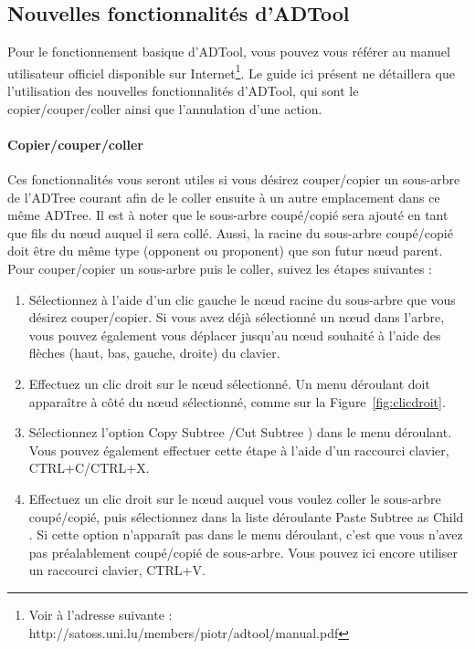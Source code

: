 \subsection{Nouvelles fonctionnalités d'ADTool}
\label{ssec:manuelADTool}

Pour le fonctionnement basique d'ADTool, vous pouvez vous référer au manuel utilisateur officiel disponible sur Internet\footnote{Voir à l'adresse suivante : http://satoss.uni.lu/members/piotr/adtool/manual.pdf}. Le guide ici présent ne détaillera que l'utilisation des nouvelles fonctionnalités d'ADTool, qui sont le copier/couper/coller ainsi que l'annulation d'une action.

\paragraph{Copier/couper/coller} Ces fonctionnalités vous seront utiles si vous désirez couper/copier un sous-arbre de l'ADTree courant afin de le coller ensuite à un autre emplacement dans ce même ADTree. Il est à noter que le sous-arbre coupé/copié sera ajouté en tant que fils du n\oe{}ud auquel il sera collé. Aussi, la racine du sous-arbre coupé/copié doit être du même type (opponent ou proponent) que son futur n\oe{}ud parent. Pour couper/copier un sous-arbre puis le coller, suivez les étapes suivantes : 
\begin{enumerate}
    \item Sélectionnez à l'aide d'un clic gauche le n\oe{}ud racine du sous-arbre que vous désirez couper/copier. Si vous avez déjà sélectionné un n\oe{}ud dans l'arbre, vous pouvez également vous déplacer jusqu'au n\oe{}ud souhaité à l'aide des flèches (haut, bas, gauche, droite) du clavier.
	\item Effectuez un clic droit sur le n\oe{}ud sélectionné. Un menu déroulant doit apparaître à côté du n\oe{}ud sélectionné, comme sur la {\sc Figure}~\ref{fig:clicdroit}.
	\item Sélectionnez l'option \og Copy Subtree \fg{}/\og Cut Subtree \fg{}) dans le menu déroulant. Vous pouvez également effectuer cette étape à l'aide d'un raccourci clavier, {\sc CTRL+C}/{\sc CTRL+X}.
	\item Effectuez un clic droit sur le n\oe{}ud auquel vous voulez coller le sous-arbre coupé/copié, puis sélectionnez dans la liste déroulante \og Paste Subtree as Child \fg{}. Si cette option n'apparaît pas dans le menu déroulant, c'est que vous n'avez pas préalablement coupé/copié de sous-arbre. Vous pouvez ici encore utiliser un raccourci clavier, {\sc CTRL+V}.
\end{enumerate}

